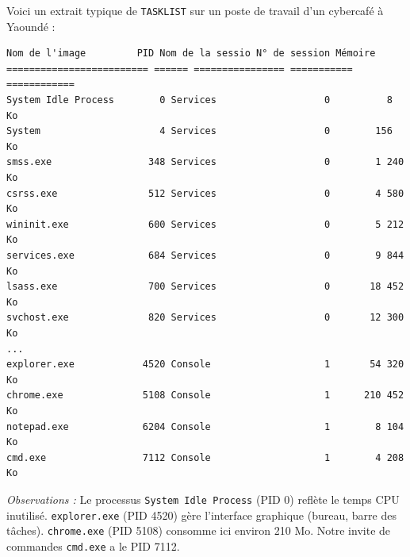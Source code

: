 \documentclass[11pt]{article}
\begin{document}
\begin{exemplebox}
Voici un extrait typique de \texttt{TASKLIST} sur un poste de travail d'un cybercafé à Yaoundé :
\begin{lstlisting}
Nom de l'image         PID Nom de la sessio N° de session Mémoire
========================= ====== ================ =========== ============
System Idle Process        0 Services                   0          8 Ko
System                     4 Services                   0        156 Ko
smss.exe                 348 Services                   0        1 240 Ko
csrss.exe                512 Services                   0        4 580 Ko
wininit.exe              600 Services                   0        5 212 Ko
services.exe             684 Services                   0        9 844 Ko
lsass.exe                700 Services                   0       18 452 Ko
svchost.exe              820 Services                   0       12 300 Ko
...
explorer.exe            4520 Console                    1       54 320 Ko
chrome.exe              5108 Console                    1      210 452 Ko
notepad.exe             6204 Console                    1        8 104 Ko
cmd.exe                 7112 Console                    1        4 208 Ko
\end{lstlisting}
\emph{Observations :} Le processus \texttt{System Idle Process} (PID 0) reflète le temps CPU inutilisé. \texttt{explorer.exe} (PID 4520) gère l'interface graphique (bureau, barre des tâches). \texttt{chrome.exe} (PID 5108) consomme ici environ 210 Mo. Notre invite de commandes \texttt{cmd.exe} a le PID 7112.
\end{exemplebox}
\end{document}

